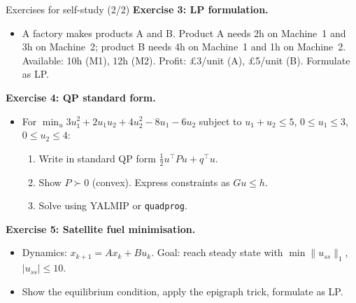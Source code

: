 \documentclass[aspectratio=169,10pt]{beamer}
\begin{document}
\begin{frame}{Exercises for self-study (2/2)}
\textbf{Exercise 3: LP formulation.}
\begin{itemize}
  \item A factory makes products A and B. Product A needs 2h on Machine~1 and 3h on Machine~2; product B needs 4h on Machine~1 and 1h on Machine~2. Available: 10h (M1), 12h (M2). Profit: \pounds3/unit (A), \pounds5/unit (B). Formulate as LP.
\end{itemize}

\vspace{0.5em}
\textbf{Exercise 4: QP standard form.}
\begin{itemize}
  \item For $\min_{u} 3u_1^2 + 2u_1 u_2 + 4u_2^2 - 8u_1 - 6u_2$ subject to $u_1 + u_2 \le 5$, $0 \le u_1 \le 3$, $0 \le u_2 \le 4$:
  \begin{enumerate}
    \item Write in standard QP form $\frac{1}{2}u^\top P u + q^\top u$.
    \item Show $P \succ 0$ (convex). Express constraints as $Gu \le h$.
    \item Solve using YALMIP or \texttt{quadprog}.
  \end{enumerate}
\end{itemize}

\vspace{0.5em}
\textbf{Exercise 5: Satellite fuel minimisation.}
\begin{itemize}
  \item Dynamics: $x_{k+1} = Ax_k + Bu_k$. Goal: reach steady state with $\min \|u_{ss}\|_1$, $|u_{ss}| \le 10$.
  \item Show the equilibrium condition, apply the epigraph trick, formulate as LP.
\end{itemize}
\end{frame}
\end{document}
